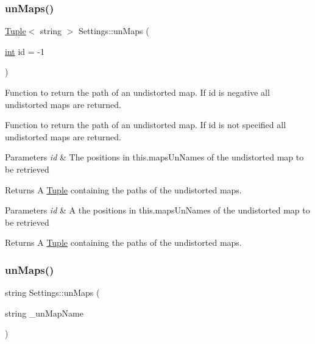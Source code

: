 \subsubsection{\texorpdfstring{unMaps()}{unMaps()}\hspace{0.1cm}{\footnotesize\ttfamily [2/4]}}
{\footnotesize\ttfamily \mbox{\hyperlink{class_tuple}{Tuple}}$<$ string $>$ Settings\+::un\+Maps (\begin{DoxyParamCaption}\item[{\mbox{\hyperlink{draw_8hh_aa620a13339ac3a1177c86edc549fda9b}{int}}}]{id = {\ttfamily -\/1} }\end{DoxyParamCaption})}



Function to return the path of an undistorted map. If id is negative all undistorted maps are returned. 

Function to return the path of an undistorted map. If id is not specified all undistorted maps are returned.


\begin{DoxyParams}{Parameters}
{\em id} & The positions in this.\+maps\+Un\+Names of the undistorted map to be retrieved \\
\hline
\end{DoxyParams}
\begin{DoxyReturn}{Returns}
A \mbox{\hyperlink{class_tuple}{Tuple}} containing the paths of the undistorted maps.
\end{DoxyReturn}

\begin{DoxyParams}{Parameters}
{\em id} & A the positions in this.\+maps\+Un\+Names of the undistorted map to be retrieved \\
\hline
\end{DoxyParams}
\begin{DoxyReturn}{Returns}
A \mbox{\hyperlink{class_tuple}{Tuple}} containing the paths of the undistorted maps. 
\end{DoxyReturn}
\mbox{\label{class_settings_a6e62c5eb18f6abc4bcbcd11e018fda8b}} 
\subsubsection{\texorpdfstring{unMaps()}{unMaps()}\hspace{0.1cm}{\footnotesize\ttfamily [3/4]}}
{\footnotesize\ttfamily string Settings\+::un\+Maps (\begin{DoxyParamCaption}\item[{string}]{\+\_\+un\+Map\+Name }\end{DoxyParamCaption})}



